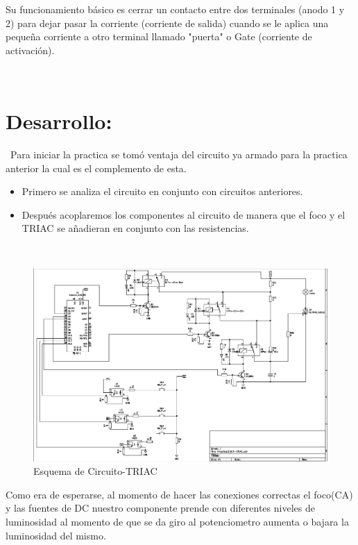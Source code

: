 \documentclass[12pt,letterpaper]{article}
\begin{document}
Su funcionamiento básico es cerrar un contacto entre dos terminales (anodo 1 y 2) para dejar pasar la corriente (corriente de salida) cuando se le aplica una pequeña corriente a otro terminal llamado "puerta" o Gate (corriente de activación).

\

\section{Desarrollo:}
\
Para iniciar la practica se tomó ventaja del circuito ya armado para la practica anterior la cual es el complemento de esta.
\

\begin{itemize}
\item Primero se analiza el circuito en conjunto con circuitos anteriores.
\item Después acoplaremos los componentes al circuito de manera que el foco y el TRIAC se añadieran en conjunto con las resistencias.
\end{itemize}
\

\begin{figure}[h!]
\begin{center}
\includegraphics[scale=0.5]{Circuito.png} 
\caption{Esquema de Circuito-TRIAC}
\end{center}
\end{figure}

\newpage
Como era de esperarse, al momento de hacer las conexiones correctas el foco(CA) y las fuentes de DC nuestro componente prende con diferentes niveles de luminosidad al momento de que se da giro al potenciometro aumenta o bajara la luminosidad del mismo.
\
\end{document}
